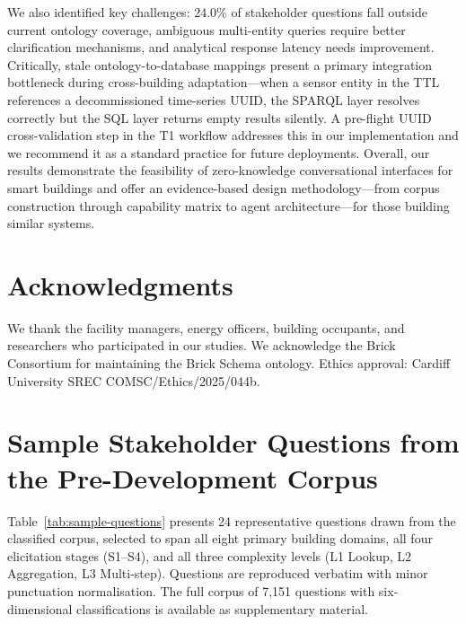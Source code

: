 \documentclass[acmsmall]{acmart}
\begin{document}
We also identified key challenges: 24.0\% of stakeholder questions fall outside current ontology coverage, ambiguous multi-entity queries require better clarification mechanisms, and analytical response latency needs improvement. Critically, stale ontology-to-database mappings present a primary integration bottleneck during cross-building adaptation---when a sensor entity in the TTL references a decommissioned time-series UUID, the SPARQL layer resolves correctly but the SQL layer returns empty results silently. A pre-flight UUID cross-validation step in the T1 workflow addresses this in our implementation and we recommend it as a standard practice for future deployments. Overall, our results demonstrate the feasibility of zero-knowledge conversational interfaces for smart buildings and offer an evidence-based design methodology---from corpus construction through capability matrix to agent architecture---for those building similar systems.


\section*{Acknowledgments}
We thank the facility managers, energy officers, building occupants, and researchers who participated in our studies. We acknowledge the Brick Consortium for maintaining the Brick Schema ontology. Ethics approval: Cardiff University SREC \mbox{COMSC/Ethics/2025/044b}.

\appendix

\section{Sample Stakeholder Questions from the Pre-Development Corpus}
\label{app:sample-questions}

Table~\ref{tab:sample-questions} presents 24 representative questions drawn from the classified corpus, selected to span all eight primary building domains, all four elicitation stages (S1--S4), and all three complexity levels (L1 Lookup, L2 Aggregation, L3 Multi-step). Questions are reproduced verbatim with minor punctuation normalisation. The full corpus of 7{,}151 questions with six-dimensional classifications is available as supplementary material.
\end{document}
